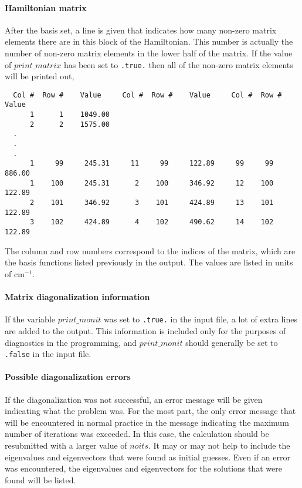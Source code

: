 \documentclass{article}
\newcommand{\wn}{cm$^{-1}$}
\begin{document}
\paragraph{Hamiltonian matrix}
After the basis set, a line is given that indicates how many non-zero
matrix elements there are in this block of the Hamiltonian. This
number is actually the number of non-zero matrix elements in the lower
half of the matrix. If the value of $print\_matrix$ has been set to
{\tt .true.} then all of the non-zero matrix elements will be printed
out,
\begin{verbatim}
  Col #  Row #    Value     Col #  Row #    Value     Col #  Row #    Value 
      1      1    1049.00
      2      2    1575.00
  .
  .
  .
      1     99     245.31     11     99     122.89     99     99     886.00
      1    100     245.31      2    100     346.92     12    100     122.89 
      2    101     346.92      3    101     424.89     13    101     122.89 
      3    102     424.89      4    102     490.62     14    102     122.89 
\end{verbatim}
The column and row numbers correspond to the indices of the matrix,
which are the basis functions listed previously in the output. The
values are listed in units of \wn .

\paragraph{Matrix diagonalization information}
If the variable $print\_monit$ was set to {\tt .true.} in the input
file, a lot of extra lines are added to the output. This information
is included only for the purposes of diagnostics in the programming,
and $print\_monit$ should generally be set to {\tt .false} in the
input file.

\paragraph{Possible diagonalization errors}
If the diagonalization was not successful, an error message will be
given indicating what the problem was. For the most part, the only
error message that will be encountered in normal practice in the
message indicating the maximum number of iterations was exceeded. In
this case, the calculation should be resubmitted with a larger value
of $noits$. It may or may not help to include the eigenvalues and
eigenvectors that were found as initial guesses. Even if an error was
encountered, the eigenvalues and eigenvectors for the solutions that
were found will be listed.
\end{document}
